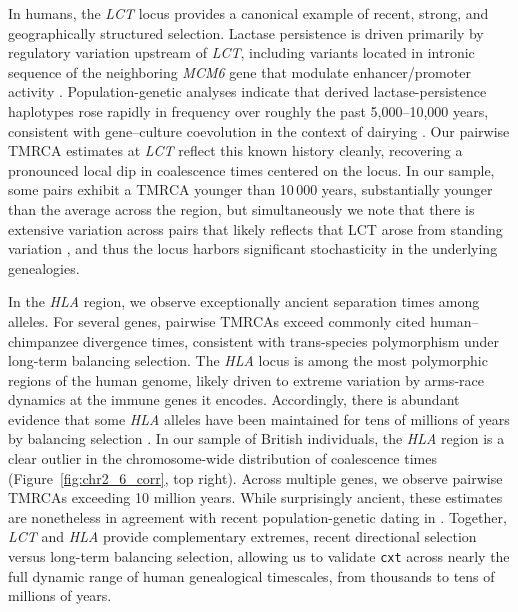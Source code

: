 \documentclass{article}
\newcommand{\cxtkit}{\texttt{cxt}\xspace}
\let\citep\parencite
\let\cite\parencite
\begin{document}
In humans,
the \emph{LCT} locus provides a canonical example of recent, strong, and geographically structured selection.
Lactase persistence is driven primarily by regulatory variation upstream of \emph{LCT},
including variants located in intronic sequence of the neighboring \emph{MCM6} gene
that modulate enhancer/promoter activity \citep{swallow2003genetics,tishkoff2007convergent}.
Population-genetic analyses indicate that derived lactase-persistence haplotypes rose rapidly in frequency
over roughly the past 5{,}000--10{,}000 years,
consistent with gene--culture coevolution in the context of dairying \citep{bersaglieri2004genetic, itan2009origins}.
Our pairwise TMRCA estimates at \emph{LCT} reflect this known history cleanly,
recovering a pronounced local dip in coalescence times centered on the locus.
In our sample,
some pairs exhibit a TMRCA younger than 10\,000 years,
substantially younger than the average across the region, 
but simultaneously we note that there is extensive
variation across pairs that likely reflects that LCT arose from standing variation \citep{peter2012distinguishing},
and thus the locus harbors significant stochasticity in the underlying genealogies. 

In the \emph{HLA} region,
we observe exceptionally ancient separation times among alleles.
For several genes,
pairwise TMRCAs exceed commonly cited human--chimpanzee divergence times,
consistent with trans-species polymorphism under long-term balancing selection.
The \emph{HLA} locus is among the most polymorphic regions of the human genome,
likely driven to extreme variation by arms-race dynamics at the immune genes it encodes.
Accordingly,
there is abundant evidence that some \emph{HLA} alleles have been maintained for tens of millions of years
by balancing selection \citep{hedrick1998balancing,azevedo2015trans,fortier2025ancient}.
In our sample of British individuals,
the \emph{HLA} region is a clear outlier in the chromosome-wide distribution of coalescence times
(Figure~\ref{fig:chr2_6_corr}, top right).
Across multiple genes,
we observe pairwise TMRCAs exceeding 10 million years.
While surprisingly ancient,
these estimates are nonetheless in agreement with recent population-genetic dating in \cite{deng2025general}.
Together, \emph{LCT} and \emph{HLA} provide complementary extremes, 
recent directional selection versus long-term balancing selection, 
allowing us to validate \cxtkit across nearly the full dynamic range of human genealogical timescales,
from thousands to tens of millions of years.
\end{document}
